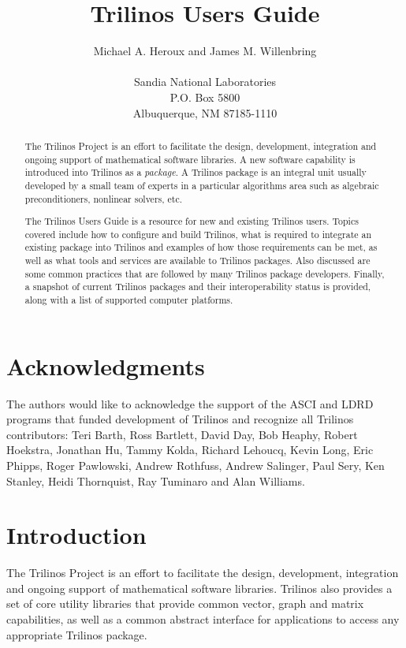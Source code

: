 \documentclass[12pt,relax]{TrilinosUserGuide}
\title{Trilinos Users Guide}
\author{
Michael A. Heroux and James M. Willenbring \\
 \\
Sandia National Laboratories \\
P.O. Box 5800 \\
Albuquerque, NM 87185-1110
}
\date{} %
\begin{document}
\maketitle
\begin{abstract}

The Trilinos Project is an effort to facilitate the design, development,
integration and ongoing support of mathematical software libraries.
A new software capability is introduced into Trilinos as a {\it
package}.  A Trilinos package is an integral unit usually developed by
a small team of experts in a particular algorithms area such as
algebraic preconditioners, nonlinear solvers, etc.

The Trilinos Users Guide is a resource for new and existing
Trilinos users.  Topics covered include how to configure and 
build Trilinos, what is required to integrate an existing package into Trilinos
and examples of how those requirements can be met, as well as what
tools and services are 
available to Trilinos packages.  Also discussed are some common practices that 
are followed by many Trilinos package developers.  Finally, a snapshot
of current Trilinos packages and their interoperability status
is provided, along with a list of supported computer platforms.

\end{abstract}

\clearpage

\section*{Acknowledgments}
The authors would like to acknowledge the support of the ASCI and LDRD 
programs that funded development of Trilinos and recognize all Trilinos 
contributors: Teri Barth, Ross Bartlett, David Day, Bob Heaphy, 
Robert Hoekstra, Jonathan Hu, Tammy Kolda, Richard Lehoucq, Kevin
Long, Eric Phipps, 
Roger Pawlowski, Andrew Rothfuss, Andrew Salinger, Paul Sery, Ken
Stanley, Heidi Thornquist, Ray Tuminaro and Alan Williams.

\clearpage
\tableofcontents
\listoffigures
\listoftables

\clearpage


\section{Introduction}
\label{Section:Introduction}
The Trilinos Project is an effort to facilitate the design, development,
integration and ongoing support of mathematical software libraries.  Trilinos 
also provides a set of core utility libraries
that provide common vector, graph and matrix capabilities, as well as
a common abstract interface for applications to access any appropriate
Trilinos package.
\end{document}
